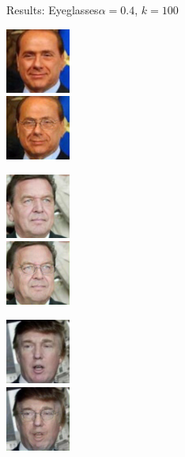 \documentclass[11pt]{beamer}
\begin{document}
\begin{frame}{Results: Eyeglasses}{$\alpha=0.4$, $k=100$}
	\centering
	\begin{minipage}{81px}
		\includegraphics[width=80px]{../pictures/outputs/start-imgs/Berlusconi.png}\\
		\includegraphics[width=80px]{../pictures/outputs/eyeglasses_alpha0.4_k100/Berlusconi.png}
	\end{minipage}%
	\begin{minipage}{81px}
		\includegraphics[width=80px]{../pictures/outputs/start-imgs/Schroeder.png}\\
		\includegraphics[width=80px]{../pictures/outputs/eyeglasses_alpha0.4_k100/Schroeder.png}
	\end{minipage}%
	\begin{minipage}{81px}
		\includegraphics[width=80px]{../pictures/outputs/start-imgs/Trump.png}\\
		\includegraphics[width=80px]{../pictures/outputs/eyeglasses_alpha0.4_k100/Trump.png}

\end{minipage}
\end{frame}
\end{document}
